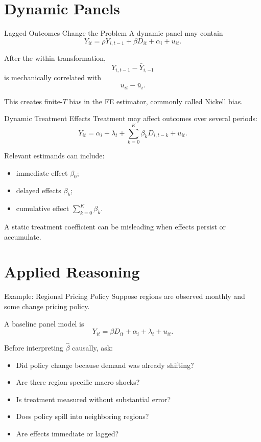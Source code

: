 \documentclass[aspectratio=169,11pt]{beamer}
\begin{document}
\section{Dynamic Panels}

\begin{frame}{Lagged Outcomes Change the Problem}
A dynamic panel may contain
\[
Y_{it}=\rho Y_{i,t-1}+\beta D_{it}+\alpha_i+u_{it}.
\]

After the within transformation,
\[
Y_{i,t-1}-\bar Y_{i,-1}
\]
is mechanically correlated with
\[
u_{it}-\bar u_i.
\]

This creates finite-\(T\) bias in the FE estimator, commonly called Nickell bias.
\end{frame}

\begin{frame}{Dynamic Treatment Effects}
Treatment may affect outcomes over several periods:
\[
Y_{it}
=
\alpha_i+\lambda_t+
\sum_{k=0}^{K}\beta_kD_{i,t-k}
+
u_{it}.
\]

Relevant estimands can include:
\begin{itemize}
\item immediate effect \(\beta_0\);
\item delayed effects \(\beta_k\);
\item cumulative effect \(\sum_{k=0}^{K}\beta_k\).
\end{itemize}

A static treatment coefficient can be misleading when effects persist or accumulate.
\end{frame}

\section{Applied Reasoning}

\begin{frame}{Example: Regional Pricing Policy}
Suppose regions are observed monthly and some change pricing policy.

A baseline panel model is
\[
Y_{it}=\beta D_{it}+\alpha_i+\lambda_t+u_{it}.
\]

Before interpreting \(\widehat\beta\) causally, ask:
\begin{itemize}
\item Did policy change because demand was already shifting?
\item Are there region-specific macro shocks?
\item Is treatment measured without substantial error?
\item Does policy spill into neighboring regions?
\item Are effects immediate or lagged?
\end{itemize}
\end{frame}
\end{document}
